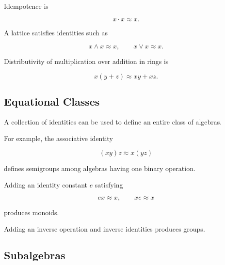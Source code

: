 Idempotence is

\[ x\cdot x\approx x. \]

A lattice satisfies identities such as

\[ x\wedge x\approx x,\qquad x\vee x\approx x. \]

Distributivity of multiplication over addition in rings is

\[ x(y+z)\approx xy+xz. \]

\subsection{Equational Classes}
\label{subsec:equational-classes}

A collection of identities can be used to define an entire class of
algebras.

For example, the associative identity

\[ (xy)z\approx x(yz) \]

defines semigroups among algebras having one binary operation.

Adding an identity constant \(e\) satisfying

\[ ex\approx x,\qquad xe\approx x \]

produces monoids.

Adding an inverse operation and inverse identities produces groups.

\begin{center}
\end{center}

\subsection{Subalgebras}
\label{subsec:universal-subalgebras}

